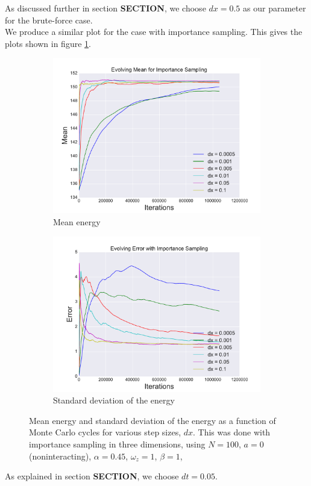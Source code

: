 \documentclass[a4paper, 10pt]{article}
\begin{document}
	As discussed further in section \textbf{SECTION}, we choose $dx=0.5$ as our parameter for the brute-force case.\\
	\linebreak
	We produce a similar plot for the case with importance sampling. This gives the plots shown in figure \ref{fig:find_dx_importance}.
		\begin{figure}[ht!]
			\centering
			\centering
			\begin{subfigure}{.5\textwidth}
				\centering
				\includegraphics[width=.8\linewidth]{../Results/EvoMeanIS.pdf}
				\caption{Mean energy}
			\end{subfigure}%
			\begin{subfigure}{.5\textwidth}
				\centering
				\includegraphics[width=.8\linewidth]{../Results/EvoStdIS.pdf}
				\caption{Standard deviation of the energy}
			\end{subfigure}
			\caption{Mean energy and standard deviation of the energy as a function of Monte Carlo cycles for various step sizes, $dx$. This was done with importance sampling in three dimensions, using $N=100$, $a=0$ (noninteracting), $\alpha=0.45$, $\omega_z=1$, $\beta=1$,}\label{fig:find_dx_importance}
		\end{figure}
	As explained in section \textbf{SECTION}, we choose $dt=0.05$.
\end{document}
